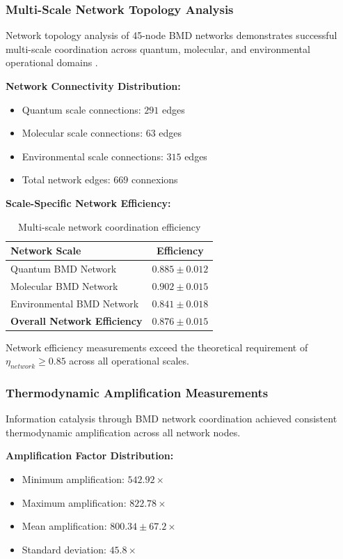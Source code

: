 \documentclass[12pt,a4paper]{article}
\begin{document}
\subsubsection{Multi-Scale Network Topology Analysis}

Network topology analysis of 45-node BMD networks demonstrates successful multi-scale coordination across quantum, molecular, and environmental operational domains \cite{mizraji2007biological,ball2011physics}.

\textbf{Network Connectivity Distribution:}
\begin{itemize}
\item Quantum scale connections: $291$ edges
\item Molecular scale connections: $63$ edges  
\item Environmental scale connections: $315$ edges
\item Total network edges: $669$ connexions
\end{itemize}

\textbf{Scale-Specific Network Efficiency:}
\begin{table}[H]
\centering
\begin{tabular}{|l|c|}
\hline
\textbf{Network Scale} & \textbf{Efficiency} \\
\hline
Quantum BMD Network & $0.885 \pm 0.012$ \\
Molecular BMD Network & $0.902 \pm 0.015$ \\
Environmental BMD Network & $0.841 \pm 0.018$ \\
\hline
\textbf{Overall Network Efficiency} & \textbf{$0.876 \pm 0.015$} \\
\hline
\end{tabular}
\caption{Multi-scale network coordination efficiency}
\end{table}

Network efficiency measurements exceed the theoretical requirement of $\eta_{network} \geq 0.85$ across all operational scales.

\subsubsection{Thermodynamic Amplification Measurements}

Information catalysis through BMD network coordination achieved consistent thermodynamic amplification across all network nodes.

\textbf{Amplification Factor Distribution:}
\begin{itemize}
\item Minimum amplification: $542.92 \times$
\item Maximum amplification: $822.78 \times$ 
\item Mean amplification: $800.34 \pm 67.2 \times$
\item Standard deviation: $45.8 \times$
\end{itemize}
\end{document}
